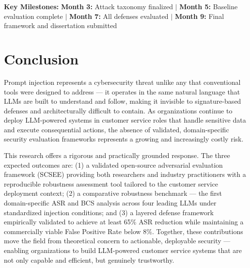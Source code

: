 \documentclass[12pt,a4paper]{article}
\begin{document}
\vspace{0.2cm}
\noindent \textbf{Key Milestones:} \textbf{Month 3:} Attack taxonomy finalized $|$ \textbf{Month 5:} Baseline evaluation complete $|$ \textbf{Month 7:} All defenses evaluated $|$ \textbf{Month 9:} Final framework and dissertation submitted

\section{Conclusion}
Prompt injection represents a cybersecurity threat unlike any that conventional tools were designed to address — it operates in the same natural language that LLMs are built to understand and follow, making it invisible to signature-based defenses and architecturally difficult to contain. As organizations continue to deploy LLM-powered systems in customer service roles that handle sensitive data and execute consequential actions, the absence of validated, domain-specific security evaluation frameworks represents a growing and increasingly costly risk.

This research offers a rigorous and practically grounded response. The three expected outcomes are: (1) a validated open-source adversarial evaluation framework (SCSEE) providing both researchers and industry practitioners with a reproducible robustness assessment tool tailored to the customer service deployment context; (2) a comparative robustness benchmark — the first domain-specific ASR and BCS analysis across four leading LLMs under standardized injection conditions; and (3) a layered defense framework empirically validated to achieve at least 65\% ASR reduction while maintaining a commercially viable False Positive Rate below 8\%. Together, these contributions move the field from theoretical concern to actionable, deployable security — enabling organizations to build LLM-powered customer service systems that are not only capable and efficient, but genuinely trustworthy.

\newpage


\end{document}
